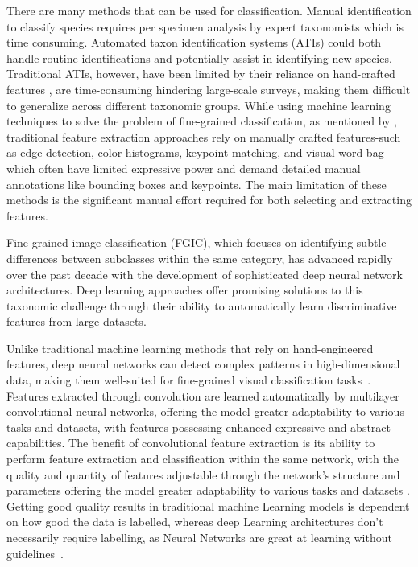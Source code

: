 \documentclass[a4paper,12pt]{report}
\begin{document}
There are many methods that can be used for classification. Manual identification to classify species requires per specimen analysis by expert taxonomists which is time consuming. Automated taxon identification systems (ATIs) could both handle routine identifications and potentially assist in identifying new species. Traditional ATIs, however, have been limited by their reliance on hand-crafted features \citep{valan}, are time-consuming hindering large-scale surveys, making them difficult to generalize across different taxonomic groups. While using machine learning techniques to solve the problem of fine-grained classification, as mentioned by \citep{Lu2024}, traditional feature extraction approaches rely on manually crafted features-such as edge detection, color histograms, keypoint matching, and visual word bag which often have limited expressive power and demand detailed manual annotations like bounding boxes and keypoints. The main limitation of these methods is the significant manual effort required for both selecting and extracting features.

Fine-grained image classification (FGIC), which focuses on identifying subtle differences between subclasses within the same category, has advanced rapidly over the past decade with the development of sophisticated deep neural network architectures. Deep learning approaches offer promising solutions to this taxonomic challenge through their ability to automatically learn discriminative features from large datasets\citep{source4}. 

Unlike traditional machine learning methods that rely on hand-engineered features, deep neural networks can detect complex patterns in high-dimensional data, making them well-suited for fine-grained visual classification tasks~\citep{valan}. Features extracted through convolution are learned automatically by multilayer convolutional neural networks, offering the model greater adaptability to various tasks and datasets, with features possessing enhanced expressive and abstract capabilities. The benefit of convolutional feature extraction is its ability to perform feature extraction and classification within the same network, with the quality and quantity of features adjustable through the network's structure and parameters offering the model greater adaptability to various tasks and datasets \citep{Lu2024}. Getting good quality results in traditional machine Learning models is dependent on how good the data is labelled, whereas deep Learning architectures don't necessarily require labelling, as Neural Networks are great at learning without guidelines~\cite{Alzubaidi2021Review}.
\end{document}
